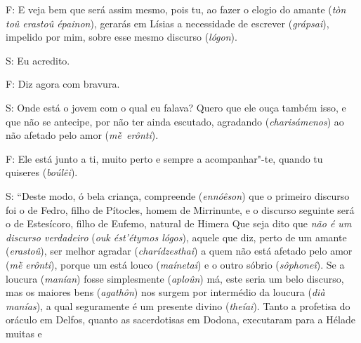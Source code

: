 F: E veja bem que será assim mesmo, pois tu, ao fazer o elogio do amante
(\emph{tòn toû erastoû épainon}), gerarás em Lísias a necessidade de
escrever (\emph{grápsai}), impelido por mim, \bekker{[243e]} sobre esse mesmo
discurso (\emph{lógon}).

S: Eu acredito.

F: Diz agora com bravura.

S: Onde está o jovem com o qual eu falava? Quero que ele ouça também
isso, e que não se antecipe, por não ter ainda escutado, agradando
(\emph{charisámenos}) ao não afetado pelo amor (\emph{mḕ~erônti}).

F: Ele está junto a ti, muito perto e sempre a acompanhar"-te, quando tu
quiseres (\emph{boúlêi}).

S: ``Deste modo, ó bela criança, compreende (\emph{ennóêson}) que o
primeiro discurso foi o de Fedro, filho de Pítocles, homem de
Mirrinunte, \bekker{[244a]} e o discurso seguinte será o de Estesícoro, filho
de Eufemo, natural de Himera Que seja dito
que \emph{não é um discurso verdadeiro} (\emph{ouk ést'étymos
lógos}), aquele que diz, perto de um amante
(\emph{erastoû}), ser melhor agradar (\emph{charídzesthai}) a quem não
está afetado pelo amor (\emph{mḕ erônti}), porque um está louco
(\emph{maínetai}) e o outro sóbrio (\emph{sôphoneî}). Se a loucura
(\emph{manían}) fosse simplesmente (\emph{aploûn}) má, este seria um
belo discurso, mas os maiores bens (\emph{agathôn}) nos surgem por
intermédio da loucura (\emph{dià manías}), a qual seguramente é um
presente divino (\emph{theíai}). Tanto a profetisa do oráculo em Delfos,
quanto as sacerdotisas em Dodona, executaram para a Hélade muitas e
